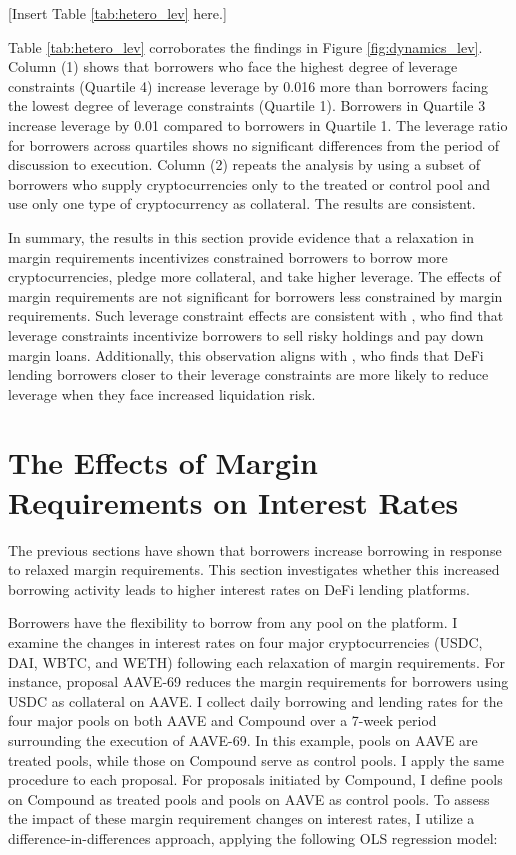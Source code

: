 \documentclass[12pt]{article}
\begin{document}
\centerline{[Insert Table \ref{tab:hetero_lev} here.]}


Table \ref{tab:hetero_lev} corroborates the findings in Figure \ref{fig:dynamics_lev}. Column (1) shows that borrowers who face the highest degree of leverage constraints (Quartile 4) increase leverage by 0.016 more than borrowers facing the lowest degree of leverage constraints (Quartile 1). Borrowers in Quartile 3 increase leverage by 0.01 compared to borrowers in Quartile 1. The leverage ratio for borrowers across quartiles shows no significant differences from the period of discussion to execution. Column (2) repeats the analysis by using a subset of borrowers who supply cryptocurrencies only to the treated or control pool and use only one type of cryptocurrency as collateral. The results are consistent.

In summary, the results in this section provide evidence that a relaxation in margin requirements incentivizes constrained borrowers to borrow more cryptocurrencies, pledge more collateral, and take higher leverage. The effects of margin requirements are not significant for borrowers less constrained by margin requirements. Such leverage constraint effects are consistent with \cite{bian2021margin}, who find that leverage constraints incentivize borrowers to sell risky holdings and pay down margin loans. Additionally, this observation aligns with \cite{mueller2023defi}, who finds that DeFi lending borrowers closer to their leverage constraints are more likely to reduce leverage when they face increased liquidation risk.

\section{The Effects of Margin Requirements on Interest Rates}\label{sec:InterestRate}
The previous sections have shown that borrowers increase borrowing in response to relaxed margin requirements. This section investigates whether this increased borrowing activity leads to higher interest rates on DeFi lending platforms.
 
Borrowers have the flexibility to borrow from any pool on the platform. I examine the changes in interest rates on four major cryptocurrencies (USDC, DAI, WBTC, and WETH) following each relaxation of margin requirements. For instance, proposal AAVE-69 reduces the margin requirements for borrowers using USDC as collateral on AAVE. I collect daily borrowing and lending rates for the four major pools on both AAVE and Compound over a 7-week period surrounding the execution of AAVE-69. In this example, pools on AAVE are treated pools, while those on Compound serve as control pools. I apply the same procedure to each proposal. For proposals initiated by Compound, I define pools on Compound as treated pools and pools on AAVE as control pools. To assess the impact of these margin requirement changes on interest rates, I utilize a difference-in-differences approach, applying the following OLS regression model:
\end{document}
